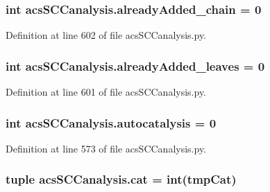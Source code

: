 \hypertarget{a00096_ac1b286545469555eb284f9b5f2bd984f}{
\subsubsection[{already\-Added\-\_\-chain}]{\setlength{\rightskip}{0pt plus 5cm}int acs\-S\-C\-Canalysis.\-already\-Added\-\_\-chain = 0}}\label{a00096_ac1b286545469555eb284f9b5f2bd984f}


Definition at line 602 of file acs\-S\-C\-Canalysis.\-py.

\hypertarget{a00096_ac842390795cf193351c795945cde8e77}{
\subsubsection[{already\-Added\-\_\-leaves}]{\setlength{\rightskip}{0pt plus 5cm}int acs\-S\-C\-Canalysis.\-already\-Added\-\_\-leaves = 0}}\label{a00096_ac842390795cf193351c795945cde8e77}


Definition at line 601 of file acs\-S\-C\-Canalysis.\-py.

\hypertarget{a00096_a70ccd5d519e878c6c8a7d0aa73caf46c}{
\subsubsection[{autocatalysis}]{\setlength{\rightskip}{0pt plus 5cm}int acs\-S\-C\-Canalysis.\-autocatalysis = 0}}\label{a00096_a70ccd5d519e878c6c8a7d0aa73caf46c}


Definition at line 573 of file acs\-S\-C\-Canalysis.\-py.

\hypertarget{a00096_aea872e34fe0da6302f6195f1b2315148}{
\subsubsection[{cat}]{\setlength{\rightskip}{0pt plus 5cm}tuple acs\-S\-C\-Canalysis.\-cat = int(tmp\-Cat)}}\label{a00096_aea872e34fe0da6302f6195f1b2315148}


